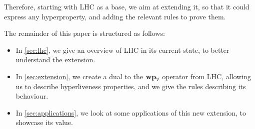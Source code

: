 Therefore, starting with LHC as a base, we aim at extending it, so that it could express any hyperproperty, and adding the relevant rules to prove them.

The remainder of this paper is structured as follows:

\begin{itemize}
    \item In \cref{sec:lhc}, we give an overview of LHC in its current state, to better understand the extension.
    \item In \cref{sec:extension}, we create a dual to the $\mathbf{wp}_{\forall}$ operator from LHC, allowing us to describe hyperliveness properties, and we give the rules describing its behaviour.
    \item In \cref{sec:applications}, we look at some applications of this new extension, to showcase its value.
\end{itemize}
